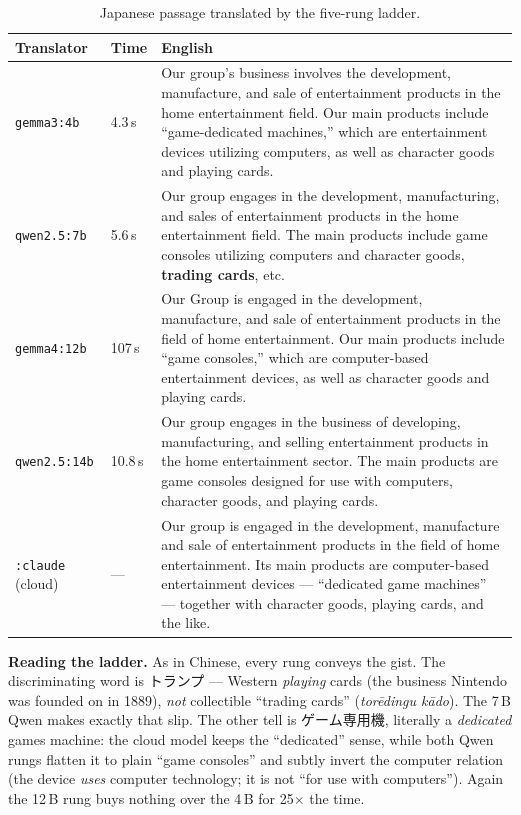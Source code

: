 \documentclass[11pt,a4paper]{report}
\newcommand{\cncjk}[2]{{\cjkCNfont #1}}
\begin{document}
\begin{table}[h]
\small
\caption{Japanese passage translated by the five-rung ladder.}
\label{tab:ladder-japan}
\begin{tabular}{@{}l l p{}@{}}
\toprule
\textbf{Translator} & \textbf{Time} & \textbf{English} \\
\midrule
\texttt{gemma3:4b} & 4.3\,s & Our group's business involves the development, manufacture, and sale of entertainment products in the home entertainment field. Our main products include ``game-dedicated machines,'' which are entertainment devices utilizing computers, as well as character goods and playing cards. \\
\addlinespace
\texttt{qwen2.5:7b} & 5.6\,s & Our group engages in the development, manufacturing, and sales of entertainment products in the home entertainment field. The main products include game consoles utilizing computers and character goods, \textbf{trading cards}, etc. \\
\addlinespace
\texttt{gemma4:12b} & 107\,s & Our Group is engaged in the development, manufacture, and sale of entertainment products in the field of home entertainment. Our main products include ``game consoles,'' which are computer-based entertainment devices, as well as character goods and playing cards. \\
\addlinespace
\texttt{qwen2.5:14b} & 10.8\,s & Our group engages in the business of developing, manufacturing, and selling entertainment products in the home entertainment sector. The main products are game consoles designed for use with computers, character goods, and playing cards. \\
\addlinespace
\texttt{:claude} (cloud) & --- & Our group is engaged in the development, manufacture and sale of entertainment products in the field of home entertainment. Its main products are computer-based entertainment devices --- ``dedicated game machines'' --- together with character goods, playing cards, and the like. \\
\bottomrule
\end{tabular}
\end{table}

\noindent \textbf{Reading the ladder.} As in Chinese, every rung conveys the gist. The discriminating word is
\cncjk{トランプ}{} --- Western \emph{playing} cards (the business Nintendo was founded on in 1889), \emph{not}
collectible ``trading cards'' (\emph{torēdingu kādo}). The 7\,B Qwen makes exactly that slip. The other tell
is \cncjk{ゲーム専用機}{}, literally a \emph{dedicated} games machine: the cloud model keeps the ``dedicated''
sense, while both Qwen rungs flatten it to plain ``game consoles'' and subtly invert the computer relation
(the device \emph{uses} computer technology; it is not ``for use with computers''). Again the 12\,B rung buys
nothing over the 4\,B for 25$\times$ the time.
\end{document}
